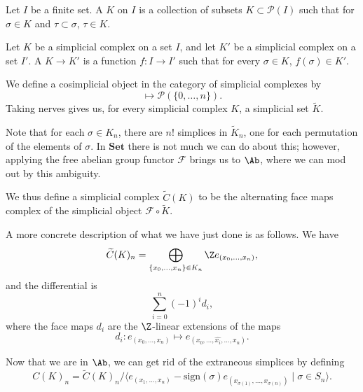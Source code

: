 \documentclass[main.tex]{subfiles}
\begin{document}
\begin{definition}
  \label{def:simplicial_complex}
  Let $I$ be a finite set. A  $K$ on $I$ is a collection of subsets $K \subset \mathcal{P}(I)$ such that for $\sigma \in K$ and $\tau \subset \sigma$, $\tau \in K$.

  Let $K$ be a simplicial complex on a set $I$, and let $K'$ be a simplicial complex on a set $I'$. A  $K \to K'$ is a function $f\colon I \to I'$ such that for every $\sigma \in K$, $f(\sigma) \in K'$.
\end{definition}

We define a cosimplicial object in the category of simplicial complexes by
\begin{equation*}
  [n] \mapsto \mathcal{P}(\{0, \ldots, n\}).
\end{equation*}
Taking nerves gives us, for every simplicial complex $K$, a simplicial set $\tilde{K}$.

Note that for each $\sigma \in K_{n}$, there are $n!$ simplices in $\tilde{K}_{n}$, one for each permutation of the elements of $\sigma$. In $\mathbf{Set}$ there is not much we can do about this; however, applying the free abelian group functor $\mathcal{F}$ brings us to $\Ab$, where we can mod out by this ambiguity.

We thus define a simplicial complex $\widetilde{C}(K)$ to be the alternating face maps complex of the simplicial object $\mathcal{F} \circ \tilde{K}$.

A more concrete description of what we have just done is as follows. We have
\begin{equation*}
  \widetilde{C}(K)_{n} = \bigoplus_{\{x_{0}, \ldots, x_{n}\} \in K_{n}} \Z e_{(x_{0}, \ldots, x_{n})},
\end{equation*}
and the differential is
\begin{equation*}
  \sum_{i = 0}^{n} (-1)^{i} d_{i},
\end{equation*}
where the face maps $d_{i}$ are the $\Z$-linear extensions of the maps
\begin{equation*}
  d_{i}\colon e_{(x_{0}, \ldots, x_{n})} \mapsto e_{(x_{0}, \ldots, \widehat{x_{i}}, \ldots, x_{n})}.
\end{equation*}

Now that we are in $\Ab$, we can get rid of the extraneous simplices by defining
\begin{equation*}
  C(K)_{n} = \widetilde{C}(K)_{n}/\langle e_{(x_{1}, \ldots, x_{n})} - \mathrm{sign}(\sigma) e_{(x_{\sigma(1)}, \ldots, x_{\sigma(n)})} \mid \sigma \in S_{n}\rangle.
\end{equation*}
\end{document}
